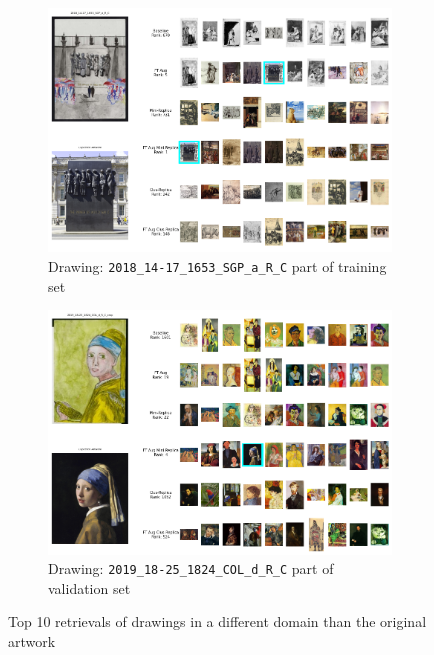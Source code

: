 {\begin{landscape}
\begin{figure}
\begin{subfigure}[b]{0.55\textwidth}
         \label{fig:2020_14-17_2051_UKR_R_C}
     \end{subfigure}
     \hfil
     \begin{subfigure}[b]{0.55\textwidth}
         \centering
         \includegraphics[width=1.01\textwidth]{images/qualitative_analysis/2018_14-17_1653_SGP_a_R_C.png}
         \caption{Drawing: \texttt{2018\_14-17\_1653\_SGP\_a\_R\_C} part of training set}
         \label{fig:2018_14-17_1653_SGP_a_R_C}
     \end{subfigure}
     \hfil
     \begin{subfigure}[b]{0.55\textwidth}
         \centering
         \includegraphics[width=1.01\textwidth]{images/qualitative_analysis/2019_18-25_1824_COL_d_R_C_crop.png}
         \caption{Drawing: \texttt{2019\_18-25\_1824\_COL\_d\_R\_C} part of validation set}
         \label{fig:2019_18-25_1824_COL_d_R_C_crop}
     \end{subfigure}
        \caption{Top 10 retrievals of drawings in a different domain than the original artwork}
        \label{fig:domain-limitation}
\end{figure}

    \end{landscape}
    \clearpage
}


